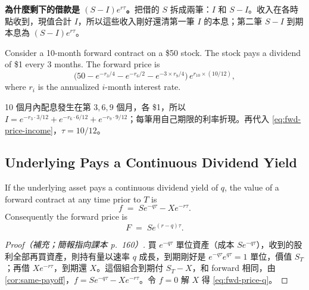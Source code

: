 \begin{remark}
	\textbf{為什麼剩下的借款是 $(S-I)e^{r\tau}$。}把借的 $S$ 拆成兩筆：$I$ 和 $S-I$。收入在各時點收到，現值合計 $I$，所以這些收入剛好還清第一筆 $I$ 的本息；第二筆 $S-I$ 到期本息為 $(S-I)e^{r\tau}$。
\end{remark}
\suppend

\begin{eg}
	Consider a 10-month forward contract on a \$50 stock.
	The stock pays a dividend of \$1 every 3 months.
	The forward price is
	\[
		\bigl(50-e^{-r_{3}/4}-e^{-r_{6}/2}-e^{-3\times r_{9}/4}\bigr)\,e^{r_{10}\times(10/12)} ,
	\]
	where $r_{i}$ is the annualized $i$-month interest rate.
\end{eg}

\suppstart
{}

\begin{remark}
	10 個月內配息發生在第 $3,6,9$ 個月，各 \$1，所以 $I=e^{-r_{3}\cdot3/12}+e^{-r_{6}\cdot6/12}+e^{-r_{9}\cdot9/12}$；每筆用自己期限的利率折現。再代入 \eqref{eq:fwd-price-income}，$\tau=10/12$。
\end{remark}
\suppend

\subsection{Underlying Pays a Continuous Dividend Yield}
\label{sec:fwd-yield}


\begin{proposition}
	\label{prop:fwd-yield}
	If the underlying asset pays a continuous dividend yield of $q$, the value of a forward contract at any time prior to $T$ is
	\begin{equation}
		f \;=\; Se^{-q\tau}-Xe^{-r\tau} .
		\label{eq:fwd-value-q}
	\end{equation}
	Consequently the forward price is
	\begin{equation}
		F \;=\; Se^{(r-q)\tau} .
		\label{eq:fwd-price-q}
	\end{equation}
\end{proposition}

\suppstart
\begin{proof}[Proof（補充；簡報指向課本 p.~160）]
	買 $e^{-q\tau}$ 單位資產（成本 $Se^{-q\tau}$），收到的股利全部再買資產，則持有量以速率 $q$ 成長，到期剛好是 $e^{-q\tau}e^{q\tau}=1$ 單位，價值 $S_{T}$；再借 $Xe^{-r\tau}$，到期還 $X$。這個組合到期付 $S_{T}-X$，和 forward 相同，由 \autoref{cor:same-payoff}，$f=Se^{-q\tau}-Xe^{-r\tau}$。令 $f=0$ 解 $X$ 得 \eqref{eq:fwd-price-q}。
\end{proof}

